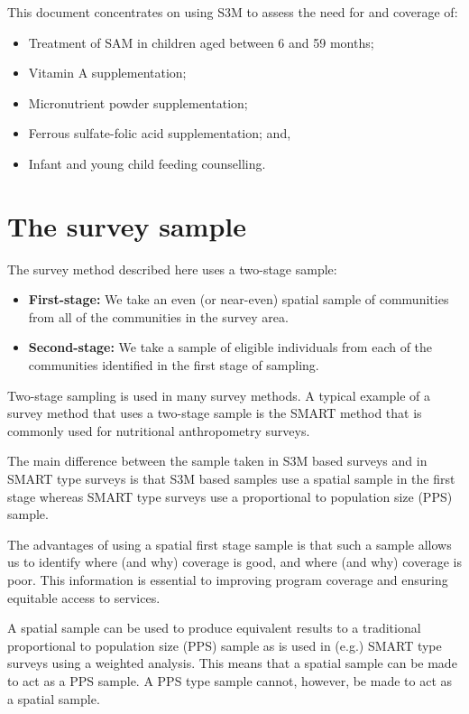 \documentclass[12pt,a4paper]{book}
\theoremstyle{definition}
\theoremstyle{definition}
\theoremstyle{definition}
\theoremstyle{remark}
\begin{document}
This document concentrates on using S3M to assess the need for and
coverage of:

\begin{itemize}
\item
  Treatment of SAM in children aged between 6 and 59 months;
\item
  Vitamin A supplementation;
\item
  Micronutrient powder supplementation;
\item
  Ferrous sulfate-folic acid supplementation; and,
\item
  Infant and young child feeding counselling.
\end{itemize}

\hypertarget{sample}{%
\chapter{The survey sample}\label{sample}}

The survey method described here uses a two-stage sample:

\begin{itemize}
\item
  \textbf{First-stage:} We take an even (or near-even) spatial sample of
  communities from all of the communities in the survey area.
\item
  \textbf{Second-stage:} We take a sample of eligible individuals from
  each of the communities identified in the first stage of sampling.
\end{itemize}

Two-stage sampling is used in many survey methods. A typical example of
a survey method that uses a two-stage sample is the SMART method that is
commonly used for nutritional anthropometry surveys.

The main difference between the sample taken in S3M based surveys and in
SMART type surveys is that S3M based samples use a spatial sample in the
first stage whereas SMART type surveys use a proportional to population
size (PPS) sample.

The advantages of using a spatial first stage sample is that such a
sample allows us to identify where (and why) coverage is good, and where
(and why) coverage is poor. This information is essential to improving
program coverage and ensuring equitable access to services.

A spatial sample can be used to produce equivalent results to a
traditional proportional to population size (PPS) sample as is used in
(e.g.) SMART type surveys using a weighted analysis. This means that a
spatial sample can be made to act as a PPS sample. A PPS type sample
cannot, however, be made to act as a spatial sample.
\end{document}
